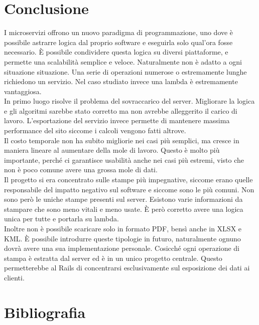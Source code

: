 \documentclass[12pt]{article}
\begin{document}
\section*{Conclusione}
I microservizi offrono un nuovo paradigma di programmazione, uno dove è possibile 
astrarre logica dal proprio software e eseguirla solo qual'ora fosse necessario. 
È possibile condividere questa logica su diversi piattaforme, e permette una 
scalabilità semplice e veloce.
Naturalmente non è adatto a ogni situazione situazione. Una serie di operazioni 
numerose o estremamente lunghe richiedono un servizio. 
Nel caso studiato invece una lambda è estremamente vantaggiosa.
\\ In primo luogo risolve il problema del sovraccarico del server. Migliorare la 
logica e gli algoritmi sarebbe stato corretto ma non avrebbe alleggerito il carico 
di lavoro. L'esportazione del servizio invece permette di mantenere massima 
performance del sito siccome i calcoli vengono fatti altrove.
\\ Il costo temporale non ha subito migliorie nei casi più semplici, ma cresce 
in maniera lineare al aumentare della mole di lavoro. Questo è molto più importante, 
perché ci garantisce usabilità anche nei casi più estremi, visto che non è 
poco comune avere una grossa mole di dati. 
\\ Il progetto si era concentrato sulle stampe più impegnative, siccome erano 
quelle responsabile del impatto negativo sul software e siccome sono le più 
comuni. Non sono però le uniche stampe presenti sul server. Esistono varie 
informazioni da stampare che sono meno vitali e meno usate.
È però corretto avere una logica unica per tutte e portarla su lambda. 
\\ Inoltre non è possibile scaricare solo in formato PDF, bensì anche in XLSX e 
KML. È possibile introdurre queste tipologie in futuro, naturalmente ognuno 
dovrà avere una sua implementazione personale. 
Cosicché ogni operazione di stampa è estratta dal server ed è in un 
unico progetto centrale.
Questo permetterebbe al Rails di concentrarsi esclusivamente sul esposizione
dei dati ai clienti.

\thispagestyle{empty}
\newpage 

\section*{Bibliografia}
\end{document}
